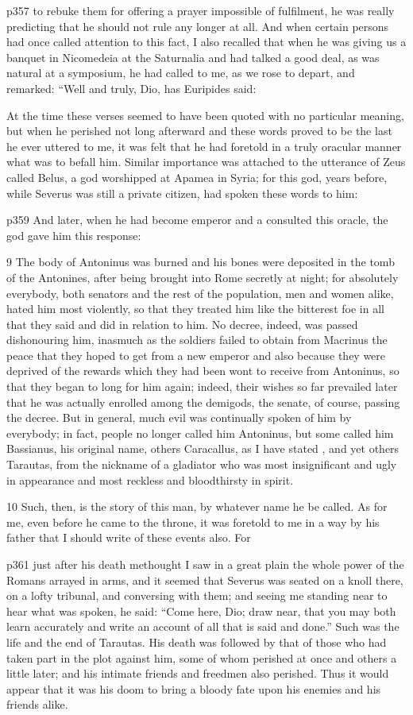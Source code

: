 p357 to rebuke them for offering a prayer impossible of fulfilment, he was really predicting that he should not rule any longer at all. And when certain persons had once called attention to this fact, I also recalled that when he was giving us a banquet in Nicomedeia at the Saturnalia and had talked a good deal, as was natural at a symposium, he had called to me, as we rose to depart, and remarked: ``Well and truly, Dio, has Euripides said:

At the time these verses seemed to have been quoted with no particular meaning, but when he perished not long afterward and these words proved to be the last he ever uttered to me, it was felt that he had foretold in a truly oracular manner what was to befall him. Similar importance was attached to the utterance of Zeus called Belus, a god worshipped at Apamea in Syria; for this god, years before, while Severus was still a private citizen, had spoken these words to him:

p359
And later, when he had become emperor and a consulted this oracle, the god gave him this response:

9
The body of Antoninus was burned and his bones were deposited in the tomb of the Antonines, after being brought into Rome secretly at night; for absolutely everybody, both senators and the rest of the population, men and women alike, hated him most violently, so that they treated him like the bitterest foe in all that they said and did in relation to him. No decree, indeed, was passed dishonouring him, inasmuch as the soldiers failed to obtain from Macrinus the peace that they hoped to get from a new emperor and also because they were deprived of the rewards which they had been wont to receive from Antoninus, so that they began to long for him again; indeed, their wishes so far prevailed later that he was actually enrolled among the demigods, the senate, of course, passing the decree. But in general, much evil was continually spoken of him by everybody; in fact, people no longer called him Antoninus, but some called him Bassianus, his original name, others Caracallus, as I have stated , and yet others Tarautas, from the nickname of a gladiator who was most insignificant and ugly in appearance and most reckless and bloodthirsty in spirit.

10
Such, then, is the story of this man, by whatever name he be called. As for me, even before he came to the throne, it was foretold to me in a way by his father that I should write of these events also. For

p361 just after his death methought I saw in a great plain the whole power of the Romans arrayed in arms, and it seemed that Severus was seated on a knoll there, on a lofty tribunal, and conversing with them; and seeing me standing near to hear what was spoken, he said: ``Come here, Dio; draw near, that you may both learn accurately and write an account of all that is said and done.'' Such was the life and the end of Tarautas. His death was followed by that of those who had taken part in the plot against him, some of whom perished at once and others a little later; and his intimate friends and freedmen also perished. Thus it would appear that it was his doom to bring a bloody fate upon his enemies and his friends alike.


